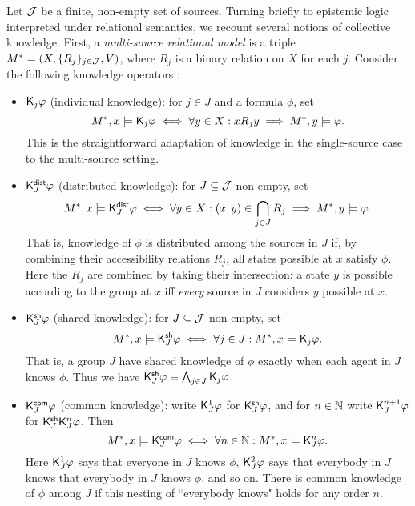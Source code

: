 Let $\mathcal{J}$ be a finite, non-empty set of sources. Turning briefly to epistemic
logic interpreted under relational semantics, we recount several notions of
collective knowledge. First, a \emph{multi-source relational model} is a triple
$M^* = (X, \{R_j\}_{j \in \mathcal{J}}, V)$, where $R_j$ is a binary relation on $X$ for
each $j$. Consider the following knowledge operators \cite{fagin2003reasoning}:

\begin{itemize}
\item $\mathsf{K}_j\varphi$ (individual knowledge): for $j \in J$ and a formula
$\phi$, set
    \[
    M^*, x \models \mathsf{K}_j\varphi
\iff
\forall y \in X: x{R_j}y \implies M^*, y \models \varphi.\]
    This is the straightforward adaptation of knowledge in the single-source case
to the multi-source setting.

    \item $\mathsf{K}^{\mathsf{dist}}_J\varphi$ (distributed knowledge): for $J \subseteq \mathcal{J}$
non-empty, set
    \[
    M^*, x \models \mathsf{K}^{\mathsf{dist}}_J\varphi
\iff
\forall y \in X: (x, y) \in \bigcap_{j \in J}{R_j}
    \implies M^*, y \models \varphi.\]
    That is, knowledge of $\phi$ is distributed among the sources in
$J$ if, by combining their accessibility relations $R_j$, all
states possible at $x$ satisfy $\phi$. Here the $R_j$ are
combined by taking their intersection: a state $y$ is possible
according to the group at $x$ iff \emph{every} source in $J$ considers
$y$ possible at $x$.

    \item $\mathsf{K}^{\mathsf{sh}}_J\varphi$ (shared knowledge):\footnotemark{} for $J \subseteq
      \mathcal{J}$ non-empty, set
    \[
    M^*, x \models \mathsf{K}^{\mathsf{sh}}_J\varphi
\iff
\forall j \in J: M^*, x \models \mathsf{K}_j\varphi.\]
    That is, a group $J$ have shared knowledge of $\phi$ exactly when
each agent in $J$ knows $\phi$. Thus we have
$\mathsf{K}^{\mathsf{sh}}_J\varphi \equiv \bigwedge_{j \in J}\mathsf{K}_j\varphi$.


    \item $\mathsf{K}^{\mathsf{com}}_J\varphi$ (common knowledge): write $\mathsf{K}_J^1\varphi$ for
$\mathsf{K}^{\mathsf{sh}}_J\varphi$, and for $n \in \mathbb{N}$ write $\mathsf{K}_J^{n +
1}\varphi$ for $\mathsf{K}^{\mathsf{sh}}_J\mathsf{K}_J^n\varphi$. Then
    \[
    M^*, x \models \mathsf{K}^{\mathsf{com}}_J\varphi
\iff
\forall n \in \mathbb{N}: M^*, x \models \mathsf{K}_J^n\varphi.\]
    Here $\mathsf{K}_J^1\varphi$ says that everyone in $J$ knows $\phi$,
$\mathsf{K}_J^2\varphi$ says that everybody in $J$ knows that everybody in
$J$ knows $\phi$, and so on. There is common knowledge of
$\phi$ among $J$ if this nesting of ``everybody knows" holds for
any order $n$.

    \end{itemize}


